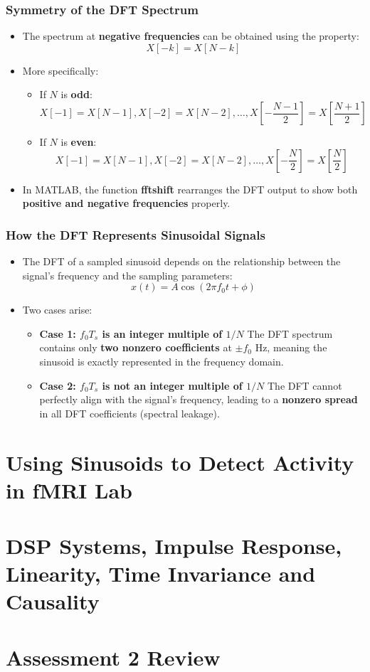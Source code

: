 \documentclass[12pt, letterpaper]{article}
\begin{document}
\subsubsection*{Symmetry of the DFT Spectrum}
\begin{itemize}
    \item The spectrum at \textbf{negative frequencies} can be obtained using the property:
    \[
    X[-k] = X[N - k]
    \]
    \item More specifically:
    \begin{itemize}
        \item If \( N \) is \textbf{odd}:
        \[
        X[-1] = X[N - 1], X[-2] = X[N - 2], \dots, X\left[-\frac{N-1}{2}\right] = X\left[\frac{N+1}{2}\right]
        \]
        \item If \( N \) is \textbf{even}:
        \[
        X[-1] = X[N - 1], X[-2] = X[N - 2], \dots, X\left[-\frac{N}{2}\right] = X\left[\frac{N}{2}\right]
        \]
    \end{itemize}
    \item In MATLAB, the function \textbf{fftshift} rearranges the DFT output to show both \textbf{positive and negative frequencies} properly.
\end{itemize}

\subsubsection*{How the DFT Represents Sinusoidal Signals}
\begin{itemize}
    \item The DFT of a sampled sinusoid depends on the relationship between the signal’s frequency and the sampling parameters:
    \[
    x(t) = A \cos(2\pi f_0 t + \phi)
    \]
    \item Two cases arise:
    \begin{itemize}
        \item \textbf{Case 1: \( f_0 T_s \) is an integer multiple of \( 1/N \)}  
        The DFT spectrum contains only \textbf{two nonzero coefficients} at \( \pm f_0 \) Hz, meaning the sinusoid is exactly represented in the frequency domain.
        \item \textbf{Case 2: \( f_0 T_s \) is not an integer multiple of \( 1/N \)}  
        The DFT cannot perfectly align with the signal's frequency, leading to a \textbf{nonzero spread} in all DFT coefficients (spectral leakage).
    \end{itemize}
\end{itemize}

\newpage
\section{Using Sinusoids to Detect Activity in fMRI Lab}
\section{DSP Systems, Impulse Response, Linearity, Time Invariance and Causality}
\section{Assessment 2 Review}
\end{document}

